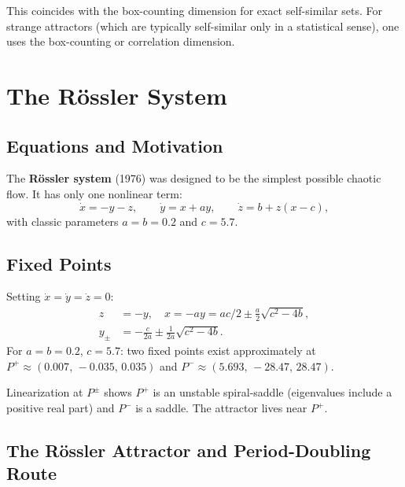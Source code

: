 \documentclass[11pt,letterpaper]{article}
\theoremstyle{definition}
\theoremstyle{plain}
\theoremstyle{remark}
\begin{document}
This coincides with the box-counting dimension for exact self-similar sets.
For strange attractors (which are typically self-similar only in a
statistical sense), one uses the box-counting or correlation dimension.

\section{The Rössler System}\label{sec:rossler}

\subsection{Equations and Motivation}

The \textbf{Rössler system} (1976) was designed to be the simplest
possible chaotic flow.  It has only one nonlinear term:
\begin{equation}\label{eq:rossler}
\boxed{
  \dot{x} = -y - z, \qquad
  \dot{y} = x + ay, \qquad
  \dot{z} = b + z(x - c),
}
\end{equation}
with classic parameters $a = b = 0.2$ and $c = 5.7$.

\subsection{Fixed Points}

Setting $\dot{x}=\dot{y}=\dot{z}=0$:
\begin{align*}
  z &= -y, \quad x = -ay = ac/2 \pm \tfrac{a}{2}\sqrt{c^2 - 4b}, \\
  y_{\pm} &= -\tfrac{c}{2a}\pm\tfrac{1}{2a}\sqrt{c^2-4b}.
\end{align*}
For $a=b=0.2$, $c=5.7$: two fixed points exist approximately at
$P^+ \approx (0.007,\,-0.035,\,0.035)$ and
$P^- \approx (5.693,\,-28.47,\,28.47)$.

Linearization at $P^\pm$ shows $P^+$ is an unstable spiral-saddle
(eigenvalues include a positive real part) and $P^-$ is a saddle.
The attractor lives near $P^+$.

\subsection{The Rössler Attractor and Period-Doubling Route}
\end{document}
